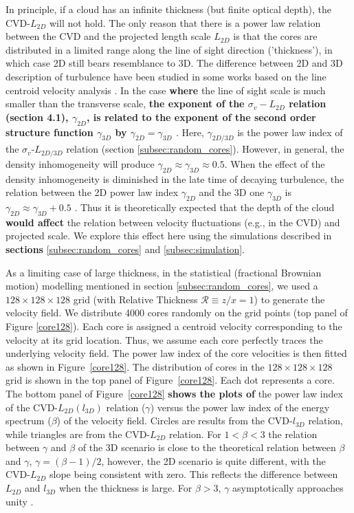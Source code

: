 \documentclass[iop,revtex4]{emulateapj}
\begin{document}
In principle, if a cloud has an infinite thickness (but finite optical depth), the CVD-$L_{2D}$ will not hold. The only reason that there is a power law relation between the CVD and the projected length scale $L_{2D}$ is that the cores are distributed in a limited range along the line of sight direction ('thickness'), in which case 2D still bears resemblance to 3D. The difference between 2D and 3D description of turbulence have been studied in some works based on the line centroid velocity analysis \citep[e.g.][]{Falgarone2003,Brunt2004}. In the case {\bf where} the line of sight scale is much smaller than the transverse scale, {\bf the exponent of the $\sigma_v-L_{2D}$ relation (section 4.1), $\gamma_{2D}$, is related to the exponent of the second order structure function $\gamma_{3D}$ by $\gamma_{2D}=\gamma_{3D}$ \citep{Falgarone2003}}. Here, $\gamma_{2D/3D}$ is the power law index of the $\sigma_v$-$L_{2D/3D}$ relation (section \ref{subsec:random_cores}). However, in general, the density inhomogeneity will produce $\gamma_{2D}\approx\gamma_{3D}\approx 0.5$. When the effect of the density inhomogeneity is diminished in the late time of decaying turbulence, the relation between the 2D power law index $\gamma_{2D}$ and the 3D one $\gamma_{3D}$ is $\gamma_{2D}\approx \gamma_{3D}+0.5$ \citep{Brunt2004}. Thus it is theoretically expected that the depth of the cloud {\bf would affect} the relation between velocity fluctuations (e.g., in the CVD) and projected scale. We explore this effect here using the simulations described in {\bf sections} \ref{subsec:random_cores} and \ref{subsec:simulation}.




As a limiting case of large thickness, in the statistical (fractional Brownian motion) modelling mentioned in section \ref{subsec:random_cores}, we used a $128\times 128\times 128$ grid (with Relative Thickness $\mathcal{R}\equiv z/x=1$) to generate the velocity field. We distribute 4000 cores randomly on the grid points (top panel of Figure \ref{core128}). Each core is assigned a centroid velocity  corresponding to the velocity at its grid location. Thus, we assume each core perfectly traces the underlying velocity field. The power law index of the core velocities is then fitted as shown in Figure~\ref{core128}. The distribution of cores in the $128\times 128\times 128$ grid is shown in the top panel of Figure~\ref{core128}. Each dot represents a core. The bottom panel of Figure~\ref{core128} {\bf shows the plots of} the power law index of the CVD-$L_{2D}(l_{3D})$ relation ($\gamma$) versus the power law index of the energy spectrum ($\beta$) of the velocity field. Circles are results from the CVD-$l_{3D}$ relation, while triangles are from the CVD-$L_{2D}$ relation. For $1< \beta <3$ the relation between $\gamma$ and $\beta$ of the 3D scenario is close to the theoretical relation between $\beta$ and $\gamma$, $\gamma=(\beta-1)/2$, however, the 2D scenario is quite different, with the CVD-$L_{2D}$ slope being consistent with zero. This reflects the difference between $L_{2D}$ and $l_{3D}$ when the thickness is large. For $\beta>3$, $\gamma$ asymptotically approaches unity \citep{Turbulence_Brunt2002}.
\end{document}
